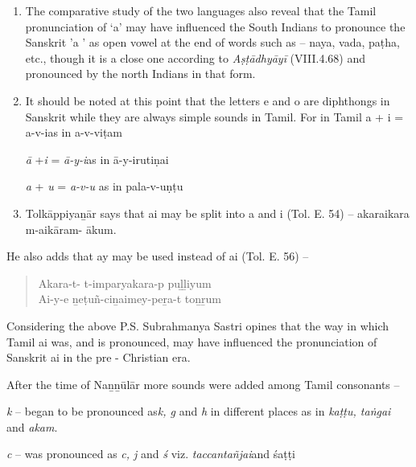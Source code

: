 \begin{enumerate}[{\rm 1)}]
\itemsep=0pt
\item The comparative study of the two languages also reveal that the Tamil pronunciation of ‘a’ may have influenced the South Indians to pronounce the Sanskrit ’a ’ as open vowel at the end of words such as – naya, vada, paṭha, etc., though it is a close one according to \textit{Aṣṭādhyāyī} (VIII.4.68) and pronounced by the north Indians in that form.

 \item 
 It should be noted at this point that the letters e and o are diphthongs in Sanskrit while they are always simple sounds in Tamil. For in Tamil a + i = a-v-ias in a-v-viṭam

 \textit{ā} +\textit{i} = \textit{ā-y-i}as in ā-y-irutiṇai

 \textit{a} + \textit{u} = \textit{a-v-u} as in pala-v-uṇṭu

 \item Tolkāppiyaṉār says that ai may be split into a and i (Tol. E. 54) – akaraikara m-aikāram- ākum.

\end{enumerate}

He also adds that ay may be used instead of ai (Tol. E. 56) –

\begin{verse}
Akara-t- t-imparyakara-p puḻḻiyum\\ Ai-y-e ṉeṭuñ-ciṉaimey-peṟa-t toṉṟum
\end{verse}

Considering the above P.S. Subrahmanya Sastri opines that the way in which Tamil ai was, and is pronounced, may have influenced the pronunciation of Sanskrit ai in the pre - Christian era.

After the time of Naṉṉūlār more sounds were added among Tamil consonants –

\begin{myquote}
\textit{k} – began to be pronounced as\textit{k, g} and \textit{h} in different places as in \textit{kaṭṭu, taṅgai} and \textit{akam}.
\end{myquote}

\begin{myquote}
\textit{c} – was pronounced as \textit{c, j} and \textit{ś} viz. \textit{taccantañjai}and śaṭṭi
\end{myquote}

